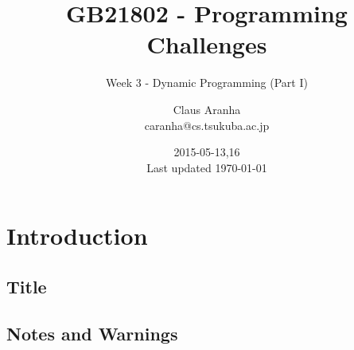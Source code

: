 \documentclass{beamer}
\title[GB21802]{GB21802 - Programming Challenges}
\subtitle[]{Week 3 - Dynamic Programming (Part I)}
\author[Claus Aranha]{Claus Aranha\\{\footnotesize caranha@cs.tsukuba.ac.jp}}
\institute{College of Information Science}
\date{2015-05-13,16\\{\tiny Last updated \today}}
\begin{document}
\section{Introduction}
\subsection{Title}
\begin{frame}
\maketitle
\end{frame}

\subsection{Notes and Warnings}
\end{document}
